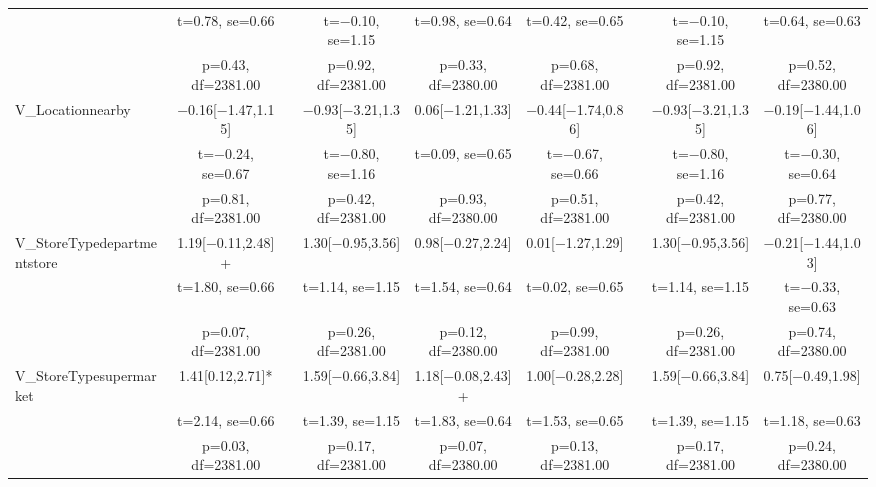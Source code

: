 \documentclass[]{report}
\begin{document}
\begin{table}
{\begin{tabular}[t]{lcccccccc}
			& t=\num{0.78}, se=\num{0.66} &  & t=\num{-0.10}, se=\num{1.15} & t=\num{0.98}, se=\num{0.64} & t=\num{0.42}, se=\num{0.65} &  & t=\num{-0.10}, se=\num{1.15} & t=\num{0.64}, se=\num{0.63}\\
			& p=\num{0.43}, df=\num{2381.00} &  & p=\num{0.92}, df=\num{2381.00} & p=\num{0.33}, df=\num{2380.00} & p=\num{0.68}, df=\num{2381.00} &  & p=\num{0.92}, df=\num{2381.00} & p=\num{0.52}, df=\num{2380.00}\\
			V\_Locationnearby & \num{-0.16}[\num{-1.47},\num{1.15}] &  & \num{-0.93}[\num{-3.21},\num{1.35}] & \num{0.06}[\num{-1.21},\num{1.33}] & \num{-0.44}[\num{-1.74},\num{0.86}] &  & \num{-0.93}[\num{-3.21},\num{1.35}] & \num{-0.19}[\num{-1.44},\num{1.06}]\\
			& t=\num{-0.24}, se=\num{0.67} &  & t=\num{-0.80}, se=\num{1.16} & t=\num{0.09}, se=\num{0.65} & t=\num{-0.67}, se=\num{0.66} &  & t=\num{-0.80}, se=\num{1.16} & t=\num{-0.30}, se=\num{0.64}\\
			& p=\num{0.81}, df=\num{2381.00} &  & p=\num{0.42}, df=\num{2381.00} & p=\num{0.93}, df=\num{2380.00} & p=\num{0.51}, df=\num{2381.00} &  & p=\num{0.42}, df=\num{2381.00} & p=\num{0.77}, df=\num{2380.00}\\
			V\_StoreTypedepartmentstore & \num{1.19}[\num{-0.11},\num{2.48}]+ &  & \num{1.30}[\num{-0.95},\num{3.56}] & \num{0.98}[\num{-0.27},\num{2.24}] & \num{0.01}[\num{-1.27},\num{1.29}] &  & \num{1.30}[\num{-0.95},\num{3.56}] & \num{-0.21}[\num{-1.44},\num{1.03}]\\
			& t=\num{1.80}, se=\num{0.66} &  & t=\num{1.14}, se=\num{1.15} & t=\num{1.54}, se=\num{0.64} & t=\num{0.02}, se=\num{0.65} &  & t=\num{1.14}, se=\num{1.15} & t=\num{-0.33}, se=\num{0.63}\\
			& p=\num{0.07}, df=\num{2381.00} &  & p=\num{0.26}, df=\num{2381.00} & p=\num{0.12}, df=\num{2380.00} & p=\num{0.99}, df=\num{2381.00} &  & p=\num{0.26}, df=\num{2381.00} & p=\num{0.74}, df=\num{2380.00}\\
			V\_StoreTypesupermarket & \num{1.41}[\num{0.12},\num{2.71}]* &  & \num{1.59}[\num{-0.66},\num{3.84}] & \num{1.18}[\num{-0.08},\num{2.43}]+ & \num{1.00}[\num{-0.28},\num{2.28}] &  & \num{1.59}[\num{-0.66},\num{3.84}] & \num{0.75}[\num{-0.49},\num{1.98}]\\
			& t=\num{2.14}, se=\num{0.66} &  & t=\num{1.39}, se=\num{1.15} & t=\num{1.83}, se=\num{0.64} & t=\num{1.53}, se=\num{0.65} &  & t=\num{1.39}, se=\num{1.15} & t=\num{1.18}, se=\num{0.63}\\
			& p=\num{0.03}, df=\num{2381.00} &  & p=\num{0.17}, df=\num{2381.00} & p=\num{0.07}, df=\num{2380.00} & p=\num{0.13}, df=\num{2381.00} &  & p=\num{0.17}, df=\num{2381.00} & p=\num{0.24}, df=\num{2380.00}\\

\end{tabular}}
\end{table}
\end{document}
